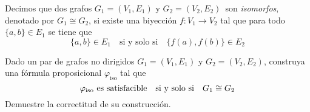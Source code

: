 Decimos que dos grafos $G_1 = (V_1, E_1)$ y $G_2 =
(V_2, E_2)$\ son {\em isomorfos}, denotado por $G_1\cong G_2$, si existe una biyección $f : V_1
\rightarrow V_2$ tal que para todo $\{a,b\}\in E_1$ se tiene que
$$\{a,b\} \in E_1\quad\text{si y solo si}\quad\{f(a), f(b)\} \in E_2$$ 

Dado un par de grafos no dirigidos $G_1=(V_1,E_1)$ y $G_2=(V_2,E_2)$, construya una fórmula proposicional $\varphi_\text{iso}$ tal que 
$$\varphi_\text{iso}\text{ es satisfacible\quad si y solo si}\quad G_1\cong G_2$$
Demuestre la correctitud de su construcción.